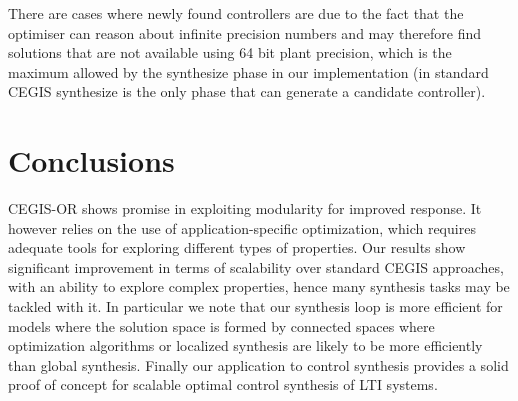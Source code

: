 \documentclass[sigconf]{llncs}
\begin{document}

There are cases where newly found controllers are due to the fact that the
optimiser can reason about infinite precision numbers and may therefore find
solutions that are not available using 64 bit plant precision, which
is the maximum allowed by the {\sc synthesize} phase in our implementation
(in standard CEGIS {\sc synthesize} is the only phase that can generate a
candidate controller).



\section{Conclusions}
\label{sec:conclusions}

CEGIS-OR shows promise in exploiting modularity for improved response. 
It however relies on the use of application-specific optimization, 
which requires adequate tools for exploring different types of properties.  
Our results show significant improvement in terms of scalability over standard CEGIS approaches, 
with an ability to explore complex properties, hence many synthesis tasks may be tackled with it. 
In particular we note that our synthesis loop is more efficient for
models where the solution space is formed by connected spaces where
optimization algorithms or localized synthesis are likely to be more
efficiently than global synthesis. 
Finally our application to control synthesis provides a solid proof
of concept for scalable optimal control synthesis of LTI systems. 
\end{document}
